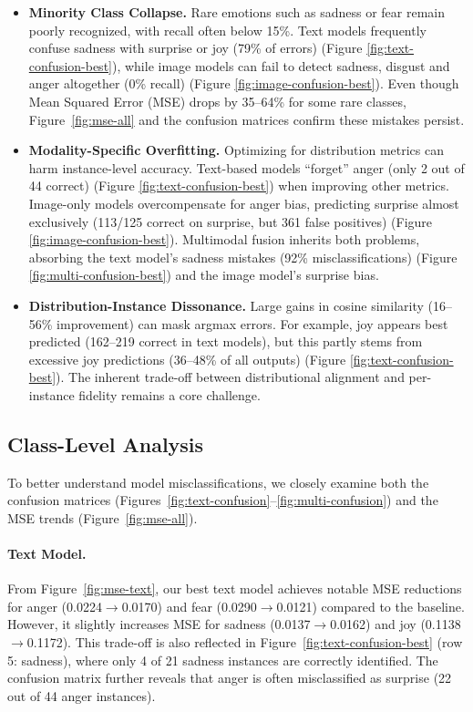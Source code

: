 \begin{itemize}
    \item \textbf{Minority Class Collapse.} Rare emotions such as sadness or fear remain poorly recognized, with recall often below 15\%. Text models frequently confuse sadness with surprise or joy (79\% of errors) (Figure \ref{fig:text-confusion-best}), while image models can fail to detect sadness, disgust and anger altogether (0\% recall) (Figure \ref{fig:image-confusion-best}). Even though Mean Squared Error (MSE) drops by 35--64\% for some rare classes, Figure~\ref{fig:mse-all} and the confusion matrices confirm these mistakes persist.

    \item \textbf{Modality-Specific Overfitting.} Optimizing for distribution metrics can harm instance-level accuracy. Text-based models “forget” anger (only 2 out of 44 correct) (Figure \ref{fig:text-confusion-best}) when improving other metrics. Image-only models overcompensate for anger bias, predicting surprise almost exclusively (113/125 correct on surprise, but 361 false positives) (Figure \ref{fig:image-confusion-best}). Multimodal fusion inherits both problems, absorbing the text model's sadness mistakes (92\% misclassifications) (Figure \ref{fig:multi-confusion-best}) and the image model's surprise bias.

    \item \textbf{Distribution-Instance Dissonance.} Large gains in cosine similarity (16--56\% improvement) can mask argmax errors. For example, joy appears best predicted (162--219 correct in text models), but this partly stems from excessive joy predictions (36--48\% of all outputs) (Figure \ref{fig:text-confusion-best}). The inherent trade-off between distributional alignment and per-instance fidelity remains a core challenge.
\end{itemize}


\subsection{Class-Level Analysis}
\label{subsec:class-level}

To better understand model misclassifications, we closely examine both the confusion matrices (Figures~\ref{fig:text-confusion}--\ref{fig:multi-confusion}) and the MSE trends (Figure~\ref{fig:mse-all}).

\paragraph{Text Model.} 
From Figure~\ref{fig:mse-text}, our best text model achieves notable MSE reductions for anger (0.0224$\rightarrow$0.0170) and fear (0.0290$\rightarrow$0.0121) compared to the baseline. However, it slightly increases MSE for sadness (0.0137$\rightarrow$0.0162) and joy (0.1138$\rightarrow$0.1172). This trade-off is also reflected in Figure~\ref{fig:text-confusion-best} (row 5: sadness), where only 4 of 21 sadness instances are correctly identified. The confusion matrix further reveals that anger is often misclassified as surprise (22 out of 44 anger instances).

